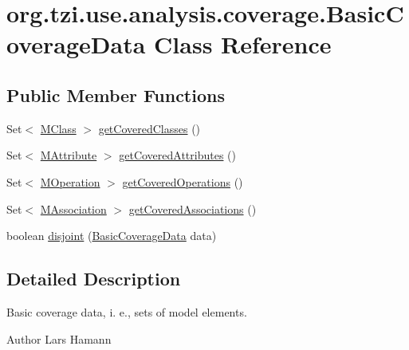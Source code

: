 \hypertarget{classorg_1_1tzi_1_1use_1_1analysis_1_1coverage_1_1_basic_coverage_data}{\section{org.\-tzi.\-use.\-analysis.\-coverage.\-Basic\-Coverage\-Data Class Reference}
\label{classorg_1_1tzi_1_1use_1_1analysis_1_1coverage_1_1_basic_coverage_data}
}
\subsection*{Public Member Functions}
\begin{DoxyCompactItemize}
\item 
Set$<$ \hyperlink{interfaceorg_1_1tzi_1_1use_1_1uml_1_1mm_1_1_m_class}{M\-Class} $>$ \hyperlink{classorg_1_1tzi_1_1use_1_1analysis_1_1coverage_1_1_basic_coverage_data_af09f73b4555dbc239adc9a489848cb48}{get\-Covered\-Classes} ()
\item 
Set$<$ \hyperlink{classorg_1_1tzi_1_1use_1_1uml_1_1mm_1_1_m_attribute}{M\-Attribute} $>$ \hyperlink{classorg_1_1tzi_1_1use_1_1analysis_1_1coverage_1_1_basic_coverage_data_a277813ba36b5e87756e36fbe9a9e3f70}{get\-Covered\-Attributes} ()
\item 
Set$<$ \hyperlink{classorg_1_1tzi_1_1use_1_1uml_1_1mm_1_1_m_operation}{M\-Operation} $>$ \hyperlink{classorg_1_1tzi_1_1use_1_1analysis_1_1coverage_1_1_basic_coverage_data_a53366609f9c6a62f7fa65992e34bf09f}{get\-Covered\-Operations} ()
\item 
Set$<$ \hyperlink{interfaceorg_1_1tzi_1_1use_1_1uml_1_1mm_1_1_m_association}{M\-Association} $>$ \hyperlink{classorg_1_1tzi_1_1use_1_1analysis_1_1coverage_1_1_basic_coverage_data_a19452f156953dc83a82fa543899a41eb}{get\-Covered\-Associations} ()
\item 
boolean \hyperlink{classorg_1_1tzi_1_1use_1_1analysis_1_1coverage_1_1_basic_coverage_data_a311a6ab29a3e550b3c46394e4a26f6cd}{disjoint} (\hyperlink{classorg_1_1tzi_1_1use_1_1analysis_1_1coverage_1_1_basic_coverage_data}{Basic\-Coverage\-Data} data)
\end{DoxyCompactItemize}


\subsection{Detailed Description}
Basic coverage data, i. e., sets of model elements. \begin{DoxyAuthor}{Author}
Lars Hamann 
\end{DoxyAuthor}


